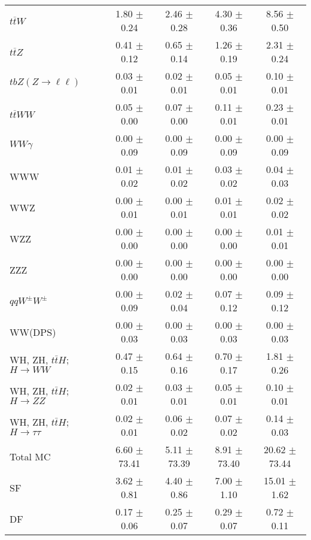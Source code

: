 \begin{tabular}{l|cccc}
                   $t\overline{t}W$ &  1.80 $\pm$  0.24 &  2.46 $\pm$  0.28 &  4.30 $\pm$  0.36 &  8.56 $\pm$  0.50 \\
                   $t\overline{t}Z$ &  0.41 $\pm$  0.12 &  0.65 $\pm$  0.14 &  1.26 $\pm$  0.19 &  2.31 $\pm$  0.24 \\
    $tbZ (Z \rightarrow \ell \ell)$ &  0.03 $\pm$  0.01 &  0.02 $\pm$  0.01 &  0.05 $\pm$  0.01 &  0.10 $\pm$  0.01 \\
                  $t\overline{t}WW$ &  0.05 $\pm$  0.00 &  0.07 $\pm$  0.00 &  0.11 $\pm$  0.01 &  0.23 $\pm$  0.01 \\
                         $WW\gamma$ &  0.00 $\pm$  0.09 &  0.00 $\pm$  0.09 &  0.00 $\pm$  0.09 &  0.00 $\pm$  0.09 \\
                                WWW &  0.01 $\pm$  0.02 &  0.01 $\pm$  0.02 &  0.03 $\pm$  0.02 &  0.04 $\pm$  0.03 \\
                                WWZ &  0.00 $\pm$  0.01 &  0.00 $\pm$  0.01 &  0.01 $\pm$  0.01 &  0.02 $\pm$  0.02 \\
                                WZZ &  0.00 $\pm$  0.00 &  0.00 $\pm$  0.00 &  0.00 $\pm$  0.00 &  0.01 $\pm$  0.01 \\
                                ZZZ &  0.00 $\pm$  0.00 &  0.00 $\pm$  0.00 &  0.00 $\pm$  0.00 &  0.00 $\pm$  0.00 \\
                 $qqW^{\pm}W^{\pm}$ &  0.00 $\pm$  0.09 &  0.02 $\pm$  0.04 &  0.07 $\pm$  0.12 &  0.09 $\pm$  0.12 \\
                            WW(DPS) &  0.00 $\pm$  0.03 &  0.00 $\pm$  0.03 &  0.00 $\pm$  0.03 &  0.00 $\pm$  0.03 \\
WH, ZH, $t\bar{t}H$; $H \rightarrow WW$ &  0.47 $\pm$  0.15 &  0.64 $\pm$  0.16 &  0.70 $\pm$  0.17 &  1.81 $\pm$  0.26 \\
WH, ZH, $t\bar{t}H$; $H \rightarrow ZZ$ &  0.02 $\pm$  0.01 &  0.03 $\pm$  0.01 &  0.05 $\pm$  0.01 &  0.10 $\pm$  0.01 \\
WH, ZH, $t\bar{t}H$; $H \rightarrow \tau\tau$ &  0.02 $\pm$  0.01 &  0.06 $\pm$  0.02 &  0.07 $\pm$  0.02 &  0.14 $\pm$  0.03 \\
\hline\hline
                           Total MC &  6.60 $\pm$ 73.41 &  5.11 $\pm$ 73.39 &  8.91 $\pm$ 73.40 & 20.62 $\pm$ 73.44 \\
\hline
                                 SF &  3.62 $\pm$  0.81 &  4.40 $\pm$  0.86 &  7.00 $\pm$  1.10 & 15.01 $\pm$  1.62 \\
                                 DF &  0.17 $\pm$  0.06 &  0.25 $\pm$  0.07 &  0.29 $\pm$  0.07 &  0.72 $\pm$  0.11 \\

\end{tabular}
